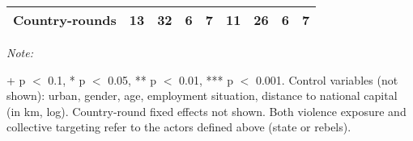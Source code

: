 \begin{table}[!h]
{\begin{threeparttable}
\begin{tabular}[t]{lcccccccc}
Country-rounds & 13 & 32 & 6 & 7 & 11 & 26 & 6 & 7\\
\bottomrule
\end{tabular}
\begin{tablenotes}[para]
\item \textit{Note: } 
\item + p $<$ 0.1, * p $<$ 0.05, ** p $<$ 0.01, *** p $<$ 0.001. Control variables (not shown): urban, gender, age, employment situation, distance to national capital (in km, log). Country-round fixed effects not shown. Both violence exposure and collective targeting refer to the actors defined above (state or rebels).
\end{tablenotes}
\end{threeparttable}}
\end{table}
